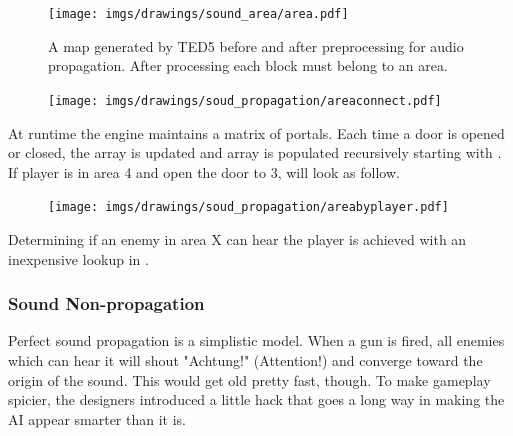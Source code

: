\par
\begin{figure}[H]
 \centering
 \texttt{[image: imgs/drawings/sound\_area/area.pdf]}
 \caption{A map generated by TED5 before and after preprocessing for audio propagation. After processing each block must belong to an area.}
\end{figure}
\par



\begin{figure}[H]
 \centering
 \texttt{[image: imgs/drawings/soud\_propagation/areaconnect.pdf]}
\end{figure}
\par
At runtime the engine maintains a matrix of portals. Each time a door is opened or closed, the array  is updated and  array is populated recursively starting with . If player is in area 4 and open the door to 3,  will look as follow.
\par
\begin{figure}[H]
 \centering
 \texttt{[image: imgs/drawings/soud\_propagation/areabyplayer.pdf]}
\end{figure}
\par
Determining if an enemy in area X can hear the player is achieved with an inexpensive lookup in .\\
\par
\begin{minipage}{\textwidth}

\end{minipage}
\par
\par







\subsubsection{Sound Non-propagation}
Perfect sound propagation is a simplistic model. When a gun is fired, all enemies which can hear it will shout "Achtung!" (Attention!) and converge toward the origin of the sound. This would get old pretty fast, though. To make gameplay spicier, the designers introduced a little hack that goes a long way in making the AI appear smarter than it is.


